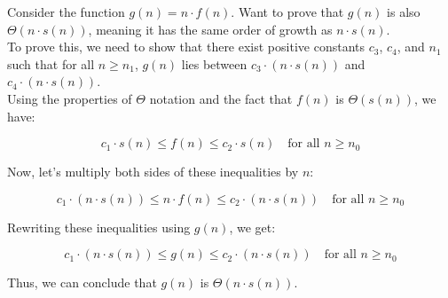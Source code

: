 Consider the function $g(n) = n \cdot f(n)$. Want to prove that $g(n)$ is also $\Theta(n \cdot s(n))$, meaning it has the same order of growth as $n \cdot s(n)$.
    \\

    To prove this, we need to show that there exist positive constants $c_3$, $c_4$, and $n_1$ such that for all $n \geq n_1$, $g(n)$ lies between $c_3 \cdot (n \cdot s(n))$ and $c_4 \cdot (n \cdot s(n))$.
    \\

    Using the properties of $\Theta$ notation and the fact that $f(n)$ is $\Theta(s(n))$, we have:

    \[
    c_1 \cdot s(n) \leq f(n) \leq c_2 \cdot s(n) \quad \text{for all } n \geq n_0
    \]

    Now, let's multiply both sides of these inequalities by $n$:

    \[
    c_1 \cdot (n \cdot s(n)) \leq n \cdot f(n) \leq c_2 \cdot (n \cdot s(n)) \quad \text{for all } n \geq n_0
    \]

    Rewriting these inequalities using $g(n)$, we get:

    \[
    c_1 \cdot (n \cdot s(n)) \leq g(n) \leq c_2 \cdot (n \cdot s(n)) \quad \text{for all } n \geq n_0
    \]

    Thus, we can conclude that $g(n)$ is $\Theta(n \cdot s(n))$.




